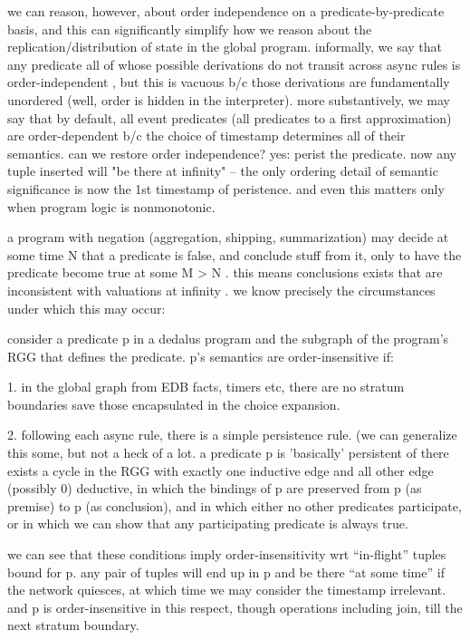 we can reason, however, about order independence on a predicate-by-predicate basis, and this
can significantly simplify how we reason about the replication/distribution of state in the
global program.  informally, we say that any predicate all of whose possible derivations 
do not transit across async rules is order-independent , but this is vacuous b/c those derivations
are fundamentally unordered (well, order is hidden in the interpreter).  more substantively,
we may say that by default, all event predicates (all predicates to a first approximation) 
are order-dependent b/c the choice of timestamp determines all of their semantics.  
can we restore order independence?  yes: perist the predicate.  now any tuple inserted will
"be there at infinity" -- the only ordering detail of semantic significance is now the 1st 
timestamp of peristence.  and even this matters only when program logic is nonmonotonic. 

a program with negation (aggregation, shipping, summarization) may decide at some time N
that a predicate is false, and conclude stuff from it, only to have the predicate become
true at some M > N .  this means conclusions exists that are inconsistent with valuations at
infinity .  we know precisely the circumstances under which this may occur:

consider a predicate p in a dedalus program and the subgraph of the program's RGG that 
defines the predicate.  p's semantics are order-insensitive if:

1. in the global graph from EDB facts, timers etc, there are no stratum boundaries save those encapsulated in the choice expansion.

2. following each async rule, there is a simple persistence rule.  (we can generalize this some,
but not a heck of a lot.  a predicate p is 'basically' persistent of there exists a cycle in the RGG 
with exactly one inductive edge and all other edge (possibly 0) deductive, in which the 
bindings of p are preserved from p (as premise) to p (as conclusion), and in which either no other predicates participate, or in which we can show that any participating predicate is always true.

we can see that these conditions imply order-insensitivity wrt ``in-flight'' tuples bound for p.
any pair of tuples will end up in p and be there ``at some time'' if the network quiesces, at 
which time we may consider the timestamp irrelevant.  and p is order-insensitive in this respect,
though operations including join, till the next stratum boundary.

